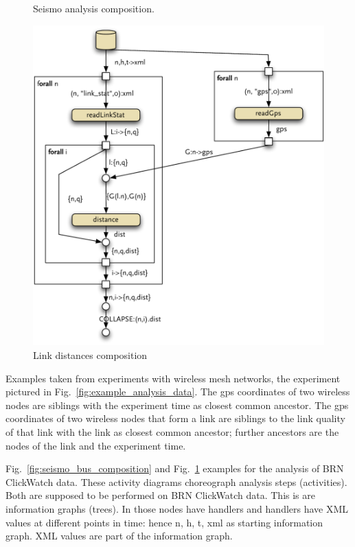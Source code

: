 \begin{figure}
{    \caption{Seismo analysis composition.}%
    \label{fig:seismo_bus_composition}
  }%
  \qquad
  \begin{minipage}{0.45\linewidth}%
    \includegraphics[width=\linewidth]{figures/link_distances_composition}
    \caption{Link distances composition}%
    \label{fig:link_distances_composition}%
  \end{minipage}
\end{figure}

Examples taken from experiments with wireless mesh networks, the experiment pictured in Fig.~\ref{fig:example_analysis_data}. The gps coordinates of two wireless nodes are siblings with the experiment time as closest common ancestor. The gps coordinates of two wireless nodes that form a link are siblings to the link quality of that link with the link as closest common ancestor; further ancestors are the nodes of the link and the experiment time.

Fig.~\ref{fig:seismo_bus_composition} and Fig.~\ref{fig:link_distances_composition} examples for the analysis of BRN ClickWatch data. These activity diagrams choreograph analysis steps (activities). Both are supposed to be performed on BRN ClickWatch data. This is are information graphs (trees). In those nodes have handlers and handlers have XML values at different points in time: hence n, h, t, xml as starting information graph. XML values are part of the information graph.

